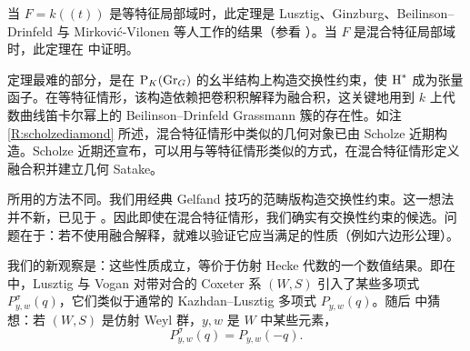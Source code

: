 当 $F=k((t))$ 是等特征局部域时，此定理是 Lusztig、Ginzburg、Beilinson–Drinfeld 与 Mirkovi\'{c}-Vilonen 等人工作的结果（参看 \cite{Lu,Gi1,BD,MV}）。当 $F$ 是混合特征局部域时，此定理在 \cite{Zh1} 中证明。

定理最难的部分，是在 $\operatorname{P}_{K}({\operatorname{Gr}}_G)$ 的幺半结构上构造交换性约束，使 $\operatorname{H}^*$ 成为张量函子。在等特征情形，该构造依赖把卷积积解释为融合积，这关键地用到 $k$ 上代数曲线笛卡尔幂上的 Beilinson–Drinfeld Grassmann 簇的存在性。如注 \ref{R:scholzediamond} 所述，混合特征情形中类似的几何对象已由 Scholze 近期构造。Scholze 近期还宣布，可以用与等特征情形类似的方式，在混合特征情形定义融合积并建立几何 Satake。

\cite{Zh1} 所用的方法不同。我们用经典 Gelfand 技巧的范畴版构造交换性约束。这一想法并不新，已见于 \cite{Gi1}。因此即使在混合特征情形，我们确实有交换性约束的候选。问题在于：若不使用融合解释，就难以验证它应当满足的性质（例如六边形公理）。

我们的新观察是：这些性质成立，等价于仿射 Hecke 代数的一个数值结果。即在 \cite{LV,Lu2} 中，Lusztig 与 Vogan 对带对合的 Coxeter 系 $(W,S)$ 引入了某些多项式 $P^\sigma_{y,w}(q)$，它们类似于通常的 Kazhdan–Lusztig 多项式 $P_{y,w}(q)$。随后 \cite{Lu2} 中猜想：若 $(W,S)$ 是仿射 Weyl 群，$y,w$ 是 $W$ 中某些元素，
\[P_{y,w}^\sigma(q)=P_{y,w}(-q).\]
